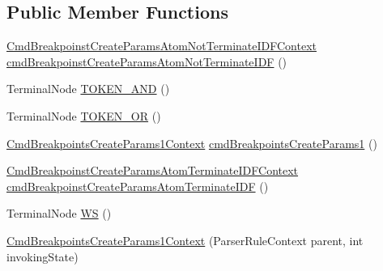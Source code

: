 \subsection*{Public Member Functions}
\begin{DoxyCompactItemize}
\item 
\hyperlink{classgov_1_1nasa_1_1jpf_1_1inspector_1_1server_1_1expression_1_1parser_1_1_expression_grammar_paee196826319d0ea00470866a7ffd8d7b}{Cmd\+Breakpoinst\+Create\+Params\+Atom\+Not\+Terminate\+I\+D\+F\+Context} \hyperlink{classgov_1_1nasa_1_1jpf_1_1inspector_1_1server_1_1expression_1_1parser_1_1_expression_grammar_pa96543943a9acc7eb3cd37320a4fc3ee4_a152266aabfe4908e200944c1928f75e7}{cmd\+Breakpoinst\+Create\+Params\+Atom\+Not\+Terminate\+I\+DF} ()
\item 
Terminal\+Node \hyperlink{classgov_1_1nasa_1_1jpf_1_1inspector_1_1server_1_1expression_1_1parser_1_1_expression_grammar_pa96543943a9acc7eb3cd37320a4fc3ee4_a12f06d4a5a5634d99407e5c463a0f915}{T\+O\+K\+E\+N\+\_\+\+A\+ND} ()
\item 
Terminal\+Node \hyperlink{classgov_1_1nasa_1_1jpf_1_1inspector_1_1server_1_1expression_1_1parser_1_1_expression_grammar_pa96543943a9acc7eb3cd37320a4fc3ee4_a18162548a4a69c02f4548c79de0b71c9}{T\+O\+K\+E\+N\+\_\+\+OR} ()
\item 
\hyperlink{classgov_1_1nasa_1_1jpf_1_1inspector_1_1server_1_1expression_1_1parser_1_1_expression_grammar_pa96543943a9acc7eb3cd37320a4fc3ee4}{Cmd\+Breakpoints\+Create\+Params1\+Context} \hyperlink{classgov_1_1nasa_1_1jpf_1_1inspector_1_1server_1_1expression_1_1parser_1_1_expression_grammar_pa96543943a9acc7eb3cd37320a4fc3ee4_a60b13f85691cf224b518005808058fe2}{cmd\+Breakpoints\+Create\+Params1} ()
\item 
\hyperlink{classgov_1_1nasa_1_1jpf_1_1inspector_1_1server_1_1expression_1_1parser_1_1_expression_grammar_pa33db42909734e187834b73b54c5beb59}{Cmd\+Breakpoinst\+Create\+Params\+Atom\+Terminate\+I\+D\+F\+Context} \hyperlink{classgov_1_1nasa_1_1jpf_1_1inspector_1_1server_1_1expression_1_1parser_1_1_expression_grammar_pa96543943a9acc7eb3cd37320a4fc3ee4_adb0ebfede707021d7556b4d8259e3a7b}{cmd\+Breakpoinst\+Create\+Params\+Atom\+Terminate\+I\+DF} ()
\item 
Terminal\+Node \hyperlink{classgov_1_1nasa_1_1jpf_1_1inspector_1_1server_1_1expression_1_1parser_1_1_expression_grammar_pa96543943a9acc7eb3cd37320a4fc3ee4_a8022db15173000bfafeacf6b2d40284b}{WS} ()
\item 
\hyperlink{classgov_1_1nasa_1_1jpf_1_1inspector_1_1server_1_1expression_1_1parser_1_1_expression_grammar_pa96543943a9acc7eb3cd37320a4fc3ee4_ad6c8a4176761ebbcbed6a797c68b0a0f}{Cmd\+Breakpoints\+Create\+Params1\+Context} (Parser\+Rule\+Context parent, int invoking\+State)

\end{DoxyCompactItemize}
